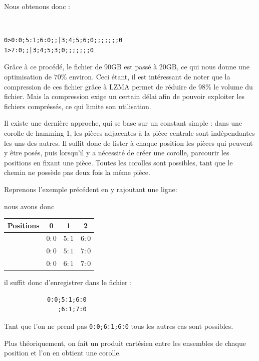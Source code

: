 	Nous obtenons donc :
	
	\begin{exmp}
		\ 
		
		\begin{lstlisting}
0>0:0;5:1;6:0;;|3;4;5;6;0;;;;;;;0
1>7:0;;|3;4;5;3;0;;;;;;;0
		\end{lstlisting}
	\end{exmp}
	
	Grâce à ce procédé, le fichier de 90GB est passé à 20GB, ce qui nous donne une optimisation de $70\%$ environ. Ceci étant, il est intéressant de noter que la compression de ces fichier grâce à LZMA \autocite{wiki:lzma} permet de réduire de $98\%$ le volume du fichier. Mais la compression exige un certain délai afin de pouvoir exploiter les fichiers compréssés, ce qui limite son utilisation.
	
	Il existe une dernière approche, qui se base sur un constant simple :
	dans une corolle de hamming 1, les pièces adjacentes à la pièce centrale sont indépendantes les uns des autres. Il suffit donc de lister à chaque position les pièces qui peuvent y être posés, puis lorsqu'il y a nécessité de créer une corolle, parcourir les positions en fixant une pièce. Toutes les corolles sont possibles, tant que le chemin ne possède pas deux fois la même pièce.
	
	\begin{exmp}
		Reprenons l'exemple précédent en y rajoutant une ligne:
		
		nous avons donc
		\begin{tabular}{|c|c c c|}
			\hline 
			Positions & 0 & 1 & 2 \\ 
			\hline 
			 & $0:0$ & $5:1$ & $6:0$ \\
			  & $0:0$ & $5:1$ & $7:0$ \\
 & $0:0$ & $6:1$& $7:0$ \\
 \hline
		\end{tabular}
		
		il suffit donc d'enregistrer dans le fichier :
		
		\begin{lstlisting}
			0:0;5:1;6:0
			   ;6:1;7:0
		\end{lstlisting}
		
		Tant que l'on ne prend pas \lstinline[columns=fixed]{0:0;6:1;6:0} tous les autres cas sont possibles.
	\end{exmp}
	
	Plus théoriquement, on fait un produit cartésien entre les ensembles de chaque position et l'on en obtient une corolle.
	
